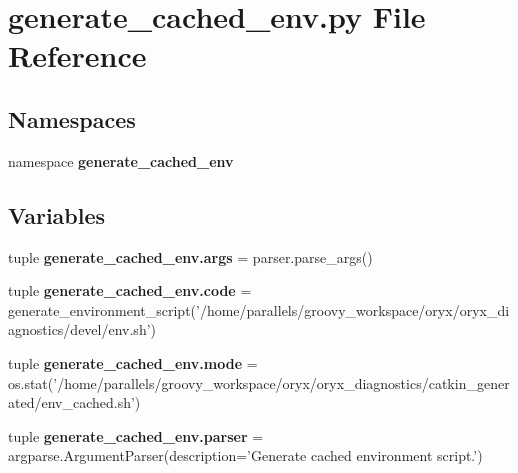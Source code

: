 \section{generate\-\_\-cached\-\_\-env.\-py \-File \-Reference}
\label{generate__cached__env_8py}
\subsection*{\-Namespaces}
\begin{DoxyCompactItemize}
\item 
namespace {\bf generate\-\_\-cached\-\_\-env}
\end{DoxyCompactItemize}
\subsection*{\-Variables}
\begin{DoxyCompactItemize}
\item 
tuple {\bf generate\-\_\-cached\-\_\-env.\-args} = parser.\-parse\-\_\-args()
\item 
tuple {\bf generate\-\_\-cached\-\_\-env.\-code} = generate\-\_\-environment\-\_\-script('/home/parallels/groovy\-\_\-workspace/oryx/oryx\-\_\-diagnostics/devel/env.\-sh')
\item 
tuple {\bf generate\-\_\-cached\-\_\-env.\-mode} = os.\-stat('/home/parallels/groovy\-\_\-workspace/oryx/oryx\-\_\-diagnostics/catkin\-\_\-generated/env\-\_\-cached.\-sh')
\item 
tuple {\bf generate\-\_\-cached\-\_\-env.\-parser} = argparse.\-Argument\-Parser(description='\-Generate cached environment script.')
\end{DoxyCompactItemize}
